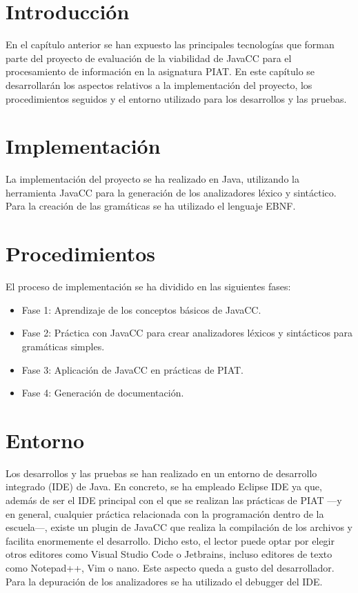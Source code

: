\section{Introducción}
\noindent En el capítulo anterior se han expuesto las principales tecnologías que forman parte del proyecto de evaluación de la viabilidad de JavaCC para el procesamiento de información en la asignatura PIAT. En este capítulo se desarrollarán los aspectos relativos a la implementación del proyecto, los procedimientos seguidos y el entorno utilizado para los desarrollos y las pruebas.

\section{Implementación}
\noindent La implementación del proyecto se ha realizado en Java, utilizando la herramienta JavaCC para la generación de los analizadores léxico y sintáctico. Para la creación de las gramáticas se ha utilizado el lenguaje EBNF.

\section{Procedimientos}

\noindent El proceso de implementación se ha dividido en las siguientes fases:
\begin{itemize}
    \item Fase 1: Aprendizaje de los conceptos básicos de JavaCC.
    \item Fase 2: Práctica con JavaCC para crear analizadores léxicos y sintácticos para gramáticas simples.
    \item Fase 3: Aplicación de JavaCC en prácticas de PIAT.
    \item Fase 4: Generación de documentación.
\end{itemize}

\section{Entorno}
\noindent Los desarrollos y las pruebas se han realizado en un entorno de desarrollo integrado (IDE) de Java. En concreto, se ha empleado Eclipse IDE ya que, además de ser el IDE principal con el que se realizan las prácticas de PIAT ---y en general, cualquier práctica relacionada con la programación dentro de la escuela---, existe un plugin de JavaCC que realiza la compilación de los archivos y facilita enormemente el desarrollo. Dicho esto, el lector puede optar por elegir otros editores como Visual Studio Code o Jetbrains, incluso editores de texto como Notepad++, Vim o  nano. Este aspecto queda a gusto del desarrollador. Para la depuración de los analizadores se ha utilizado el debugger del IDE.

